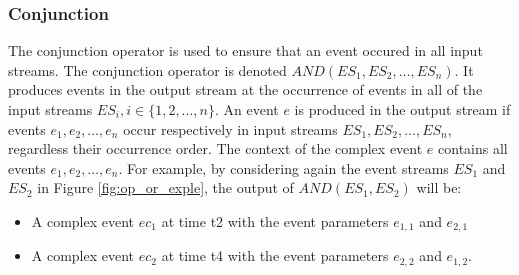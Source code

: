 \subsubsection{Conjunction}
  The conjunction operator is used to ensure that an event occured in all input streams. The conjunction operator is  denoted $AND(ES_1, ES_2, …, ES_n)$. It produces events in the output stream at the occurrence of events in all of the input streams $ES_i, i \in \{1, 2, …,n\}$. An event $e$ is produced in the output stream if events $e_1, e_2, …, e_n$ occur respectively in input streams $ES_1, ES_2, …, ES_n$, regardless their occurrence order. The context of the complex event $e$ contains all events $e_1, e_2, …, e_n$.
 For example, by considering again the event streams $ES_1$ and $ES_2$ in Figure \ref{fig:op_or_exple}, the output of $AND(ES_1, ES_2)$ will be:
 \begin{itemize}
  \item A complex event $ec_1$ at time t2 with the event parameters $e_{1,1}$ and $e_{2,1}$
  \item A complex event $ec_2$ at time t4 with the event parameters $e_{2,2}$ and $e_{1,2}$.
 \end{itemize}
